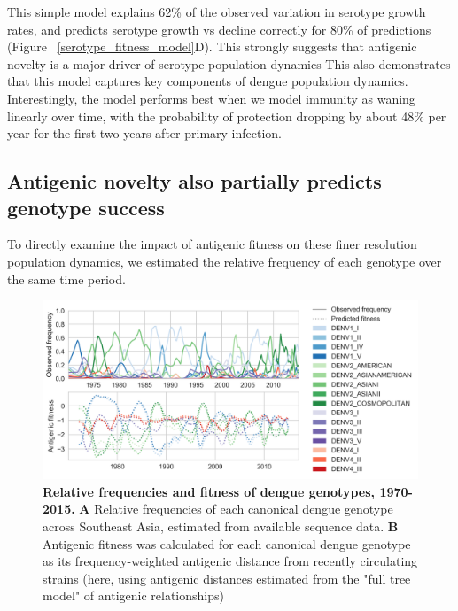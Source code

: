 \documentclass[11pt,oneside,letterpaper]{article}
\begin{document}
This simple model explains 62\% of the observed variation in serotype growth rates, and predicts serotype growth vs decline correctly for 80\% of predictions (Figure ~\ref{serotype_fitness_model}D).
This strongly suggests that antigenic novelty is a major driver of serotype population dynamics %
This also demonstrates that this model captures key components of dengue population dynamics.
Interestingly, the model performs best when we model immunity as waning linearly over time, with the probability of protection dropping by about 48\% per year for the first two years after primary infection.

\subsection{Antigenic novelty also partially predicts genotype success}

To directly examine the impact of antigenic fitness on these finer resolution population dynamics, we estimated the relative frequency of each genotype over the same time period.

\begin{figure}[h]
  \begin{centering}
\includegraphics[width=\linewidth]{../figures/png/genotype_fitness.png}
    \caption{\textbf{Relative frequencies and fitness of dengue genotypes, 1970-2015.} \linebreak \textbf{A} Relative frequencies of each canonical dengue genotype across Southeast Asia, estimated from available sequence data. \textbf{B} Antigenic fitness was calculated for each canonical dengue genotype as its frequency-weighted antigenic distance from recently circulating strains (here, using antigenic distances estimated from the "full tree model" of antigenic relationships)}
     \label{genotype_fitness}
   \end{centering}
\end{figure}
\end{document}
